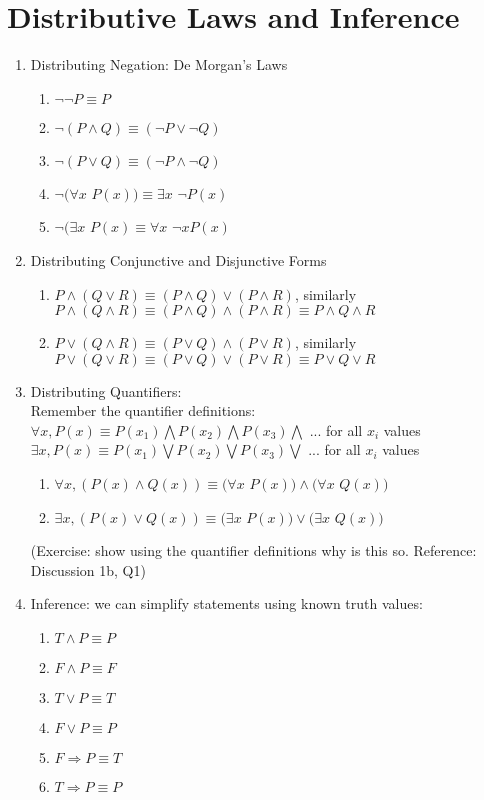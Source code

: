 \documentclass[11pt]{article}
\begin{document}
\section*{Distributive Laws and Inference}
\begin{enumerate}
\item Distributing Negation: De Morgan's Laws
\begin{enumerate}
\item $\neg {\neg P} \equiv P$
\item $\neg (P \wedge Q) \equiv ({\neg P} \vee {\neg Q})$
\item $\neg (P \vee Q) \equiv ({\neg P} \wedge {\neg Q})$
\item $ \neg (\forall x$ $P(x)) \equiv \exists x$ ${\neg P(x)}$
\item $ \neg (\exists x$ $P(x) \equiv \forall x$ ${\neg x P(x)}$
\end{enumerate}

\item Distributing Conjunctive and Disjunctive Forms
\begin{enumerate}
\item $P \wedge (Q \vee R) \equiv (P \wedge Q) \vee (P \wedge R)$, similarly $P \wedge (Q \wedge R) \equiv (P \wedge Q) \wedge (P \wedge R) \equiv P \wedge Q \wedge R$
\item $P \vee (Q \wedge R) \equiv (P \vee Q) \wedge (P \vee R)$, similarly $P \vee (Q \vee R) \equiv (P \vee Q) \vee (P \vee R) \equiv P \vee Q \vee R$
\end{enumerate}

\newpage
\item Distributing Quantifiers:\\
Remember the quantifier definitions:\\
$\forall x, P(x) \equiv P({x_1}) \bigwedge P({x_2}) \bigwedge P({x_3}) \bigwedge $ ... for all ${x_i}$ values \\
$\exists x, P(x) \equiv P({x_1}) \bigvee P({x_2}) \bigvee P({x_3}) \bigvee $ ... for all ${x_i}$ values
\begin{enumerate}
\item $\forall x, (P(x) \wedge Q(x)) \equiv (\forall x$ $P(x)) \wedge (\forall x$ $Q(x))$
\item $\exists x, (P(x) \vee Q(x)) \equiv (\exists x$ $P(x)) \vee (\exists x$ $Q(x))$
\end{enumerate}
(Exercise: show using the quantifier definitions why is this so. Reference: Discussion 1b, Q1)

\item Inference: we can simplify statements using known truth values:
\begin{enumerate}
\item $T \wedge P \equiv P$
\item $F \wedge P \equiv F$
\item $T\vee P \equiv T$
\item $F \vee P \equiv P$
\item $F \Rightarrow P \equiv T$
\item $T \Rightarrow P \equiv P$
\end{enumerate}


\end{enumerate}
\end{document}
